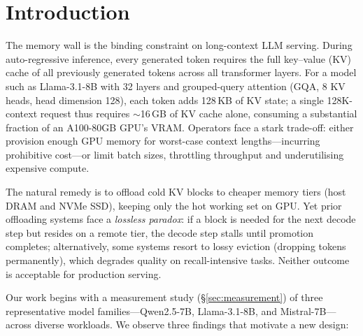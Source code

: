 \documentclass[acmsmall,nonacm,screen]{acmart}
\begin{document}
\maketitle

\section{Introduction}\label{sec:intro}

The memory wall is the binding constraint on long-context LLM serving.
During auto-regressive inference, every generated token requires the full
key--value (KV) cache of all previously generated tokens across all
transformer layers.  For a model such as Llama-3.1-8B with 32 layers and
grouped-query attention (GQA, 8 KV heads, head dimension 128), each token
adds 128\,KB of KV state; a single 128K-context request thus requires
${\sim}$16\,GB of KV cache alone, consuming a substantial fraction of an
A100-80GB GPU's VRAM.  Operators face a stark trade-off: either provision
enough GPU memory for worst-case context lengths---incurring prohibitive
cost---or limit batch sizes, throttling throughput and underutilising
expensive compute.

The natural remedy is to offload cold KV blocks to cheaper memory tiers
(host DRAM and NVMe SSD), keeping only the hot working set on GPU.  Yet
prior offloading systems face a \emph{lossless paradox}: if a block is
needed for the next decode step but resides on a remote tier, the decode
step stalls until promotion completes; alternatively, some systems resort to
lossy eviction (dropping tokens permanently), which degrades quality on
recall-intensive tasks.  Neither outcome is acceptable for production serving.

Our work begins with a measurement study (\S\ref{sec:measurement}) of three
representative model families---Qwen2.5-7B, Llama-3.1-8B, and Mistral-7B---across
diverse workloads.  We observe three findings that motivate a new design:
\end{document}
